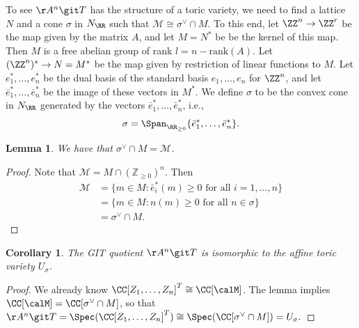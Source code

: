 \documentclass[12pt]{amsart}
\theoremstyle{plain}
\newtheorem{corollary}[theorem]{Corollary}
\newtheorem{lemma}[theorem]{Lemma}
\begin{document}
To see $\AA^n \git T$ has the structure of a toric variety, we need to find a lattice $N$ and a cone $\sigma$ in $N_\RR$ such that $\mathcal{M} \cong \sigma^\vee \cap M$.
To this end, let $\ZZ^n \to \ZZ^r$ be the map given by the matrix $A$, and let $M = N^*$ be be the kernel of this map.
Then $M$ is a free abelian group of rank $l = n - \mathrm{rank}(A)$.
Let $(\ZZ^n)^* \to N = M^*$ be the map given by restriction of linear functions to $M$.
Let $e_1^*, \ldots, e_n^*$ be the dual basis of the standard basis $e_1, \ldots, e_n$ for $\ZZ^n$, and let $\bar{e}_1^*, \ldots, \bar{e}_n^*$ be the image of these vectors in $M^*$.
We define $\sigma$ to be the convex cone in $N_\RR$ generated by the vectors $\bar{e}_1^*, \ldots, \bar{e}_n^*$, i.e.,
$$\sigma = \Span_{\RR_{\ge 0}}\{ \bar{e}_1^* , \ldots, \bar{e}_n^*\}.$$

\begin{lemma}
We have that $\sigma^\vee \cap M = \mathcal{M}$.
\end{lemma}
\begin{proof}
Note that $\mathcal{M} = M \cap (\mathbb{Z}_{\ge 0})^n$.
Then
\begin{align*}
	\mathcal{M} &= \{m \in M : \bar{e}_i^*(m) \ge 0 \text{ for all } i = 1, \ldots, n\} \\
			&= \{m \in M : n(m) \ge 0 \text{ for all } n \in \sigma\} \\
			&= \sigma^\vee \cap M.
\end{align*}
\end{proof}

\begin{corollary}
The GIT quotient $\AA^n \git T$ is isomorphic to the affine toric variety $U_\sigma$.
\end{corollary}
\begin{proof}
We already know $\CC[Z_1, \ldots, Z_n]^T \cong \CC[\calM]$.
The lemma implies $\CC[\calM] = \CC[\sigma^\vee \cap M]$, so that $\AA^n \git T = \Spec(\CC[Z_1, \ldots, Z_n]^T) \cong \Spec(\CC[\sigma^\vee \cap M]) = U_\sigma.$ 
\end{proof}
\end{document}
